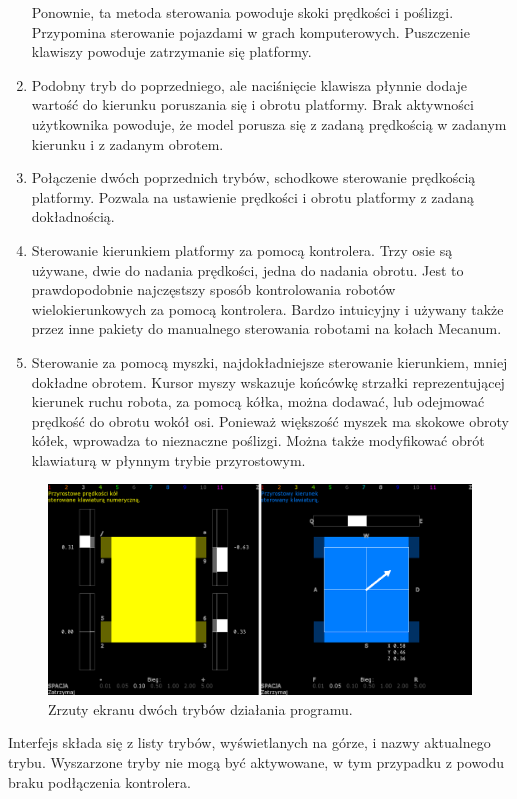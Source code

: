 \begin{enumerate}
			Ponownie, ta metoda sterowania powoduje skoki prędkości i poślizgi. Przypomina sterowanie pojazdami w grach komputerowych.
			Puszczenie klawiszy powoduje zatrzymanie się platformy.
			\item Podobny tryb do poprzedniego, ale naciśnięcie klawisza płynnie dodaje wartość do kierunku poruszania się i obrotu platformy.
			Brak aktywności użytkownika powoduje, że model porusza się z zadaną prędkością w zadanym kierunku i z zadanym obrotem.
			\item Połączenie dwóch poprzednich trybów, schodkowe sterowanie prędkością platformy. Pozwala na ustawienie prędkości i obrotu platformy z zadaną dokładnością.
			\item Sterowanie kierunkiem platformy za pomocą kontrolera. Trzy osie są używane, dwie do nadania prędkości, jedna do nadania obrotu.
			Jest to prawdopodobnie najczęstszy sposób kontrolowania robotów wielokierunkowych za pomocą kontrolera.
			Bardzo intuicyjny i używany także przez inne pakiety do manualnego sterowania robotami na kołach Mecanum.
			\item Sterowanie za pomocą myszki, najdokładniejsze sterowanie kierunkiem, mniej dokładne obrotem.
			Kursor myszy wskazuje końcówkę strzałki reprezentującej kierunek ruchu robota, za pomocą kółka, można dodawać, lub odejmować prędkość do obrotu wokół osi.
			Ponieważ większość myszek ma skokowe obroty kółek, wprowadza to nieznaczne poślizgi. Można także modyfikować obrót klawiaturą w płynnym trybie przyrostowym.
		\end{enumerate}
	
	\begin{figure}[H]
	\centering
	\includegraphics[width=\textwidth]{graphics/lalkarz.png}
	\caption{Zrzuty ekranu dwóch trybów działania programu.}
	\label{fig:lalkarz}
	\end{figure}
	
	Interfejs składa się z listy trybów, wyświetlanych na górze, i nazwy aktualnego trybu.
	Wyszarzone tryby nie mogą być aktywowane, w tym przypadku z powodu braku podłączenia kontrolera.
	
